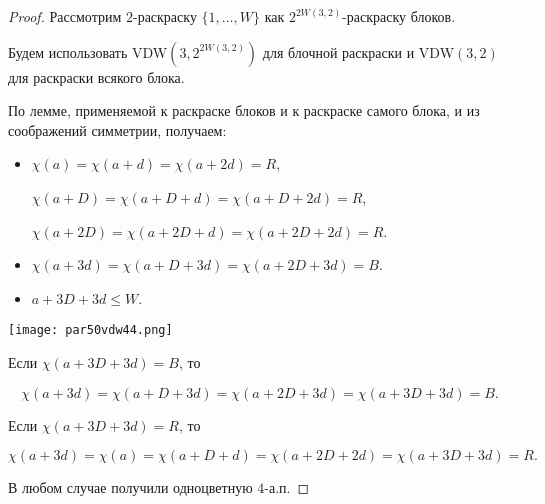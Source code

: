 \begin{normalsize}
\begin{proof}
    Рассмотрим $2$-раскраску $\{1, \ldots, W\}$ как $2^{2W(3, 2)}$-раскраску блоков.

    Будем использовать VDW$(3, 2^{2W(3, 2)})$ для блочной раскраски и VDW$(3, 2)$ для раскраски всякого блока.

    По лемме, применяемой к раскраске блоков и к раскраске самого блока, и из соображений симметрии, получаем:

    \begin{itemize}
        \item $\chi(a) = \chi(a + d) = \chi(a + 2d) = R$,
        
        $\chi(a + D) = \chi(a + D + d) = \chi(a + D + 2d) = R$,
        
        $\chi(a + 2D) = \chi(a + 2D + d) = \chi(a + 2D + 2d) = R$.

        \item $\chi(a + 3d) = \chi(a + D + 3d) = \chi(a + 2D + 3d) = B$.
        
        \item $a + 3D + 3d \leq W$.
    \end{itemize}

    \begin{center}
        \texttt{[image: par50vdw44.png]}
    \end{center}

    Если $\chi(a + 3D + 3d) = B$, то 
    
    \[ \chi(a + 3d) = \chi(a + D + 3d) = \chi(a + 2D + 3d) = \chi(a + 3D + 3d) = B. \]

    Если $\chi(a + 3D + 3d) = R$, то

    \[ \chi(a + 3d) = \chi(a) = \chi(a + D + d) = \chi(a + 2D + 2d) = \chi(a + 3D + 3d) = R. \]

    В любом случае получили одноцветную $4$-а.п.

\end{proof}

\end{normalsize}
